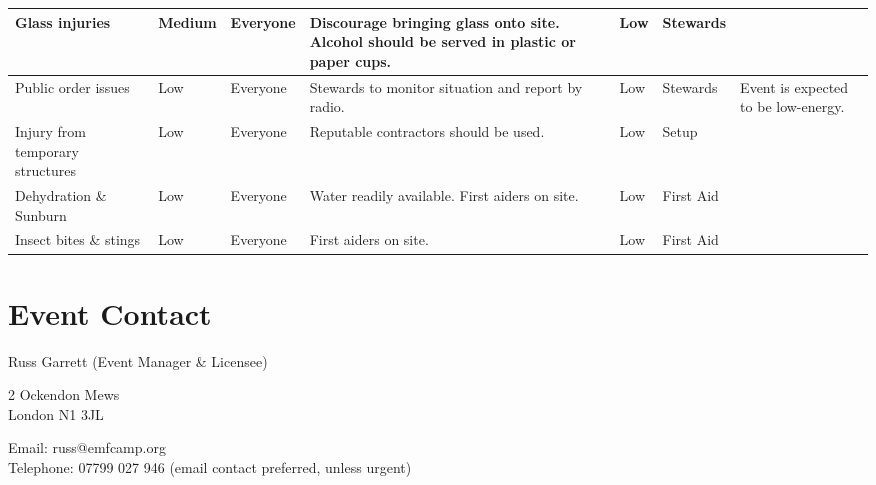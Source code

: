 \begin{landscape}
\begin{tabular}{ | p{3cm} | l | p{1.5cm} | p{8cm} | p{1.5cm} | p{2cm} | p{5cm} | }
Glass injuries & Medium & Everyone &
Discourage bringing glass onto site. Alcohol should be served in plastic or paper cups. &
Low & Stewards & \\ \hline

Public order issues & Low & Everyone &
Stewards to monitor situation and report by radio. &
Low & Stewards & Event is expected to be low-energy. \\ \hline

Injury from temporary structures & Low & Everyone &
Reputable contractors should be used. &
Low & Setup & \\ \hline

Dehydration \& Sunburn & Low & Everyone &
Water readily available. First aiders on site. & Low & First Aid & \\ \hline

Insect bites \& stings & Low & Everyone & 
First aiders on site. & Low & First Aid & \\ \hline

\end{tabular}

\end{landscape}


\section{Event Contact}

Russ Garrett (Event Manager \& Licensee)

2 Ockendon Mews \\
London N1 3JL

Email: russ@emfcamp.org \\
Telephone: 07799 027 946 (email contact preferred, unless urgent)

